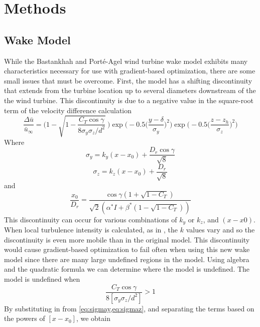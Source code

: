 \documentclass[conf]{new-aiaa}
\begin{document}
\section{Methods}

\subsection{Wake Model}

While the Bastankhah and Port\'{e}-Agel wind turbine wake model exhibits many characteristics necessary for use with gradient-based optimization, there are some small issues that must be overcome. First, the model has a shifting discontinuity that extends from the turbine location up to several diameters downstream of the the wind turbine. This discontinuity is due to a negative value in the square-root term of the velocity difference calculation
\begin{equation}
	\frac{\Delta \bar{u}}{\bar{u}_{\infty}} = \Bigg(1-\sqrt{1-\frac{C_T \cos{\gamma}}{8 \sigma_y \sigma_z/d^2}}~\Bigg) \exp{\bigg(-0.5\Big(\frac{y-\delta}{\sigma_y}\Big)^2\bigg)}\exp{\bigg(-0.5\Big(\frac{z-z_h}{\sigma_z}\Big)^2\bigg)}
\end{equation}
%
Where 
%
\begin{equation}\label{eq:sigmay}
	\sigma_y = k_y (x - x_0) + \frac{D_r \cos{\gamma}}{\sqrt{8}}
\end{equation}
%
%
\begin{equation}\label{eq:sigmaz}
	\sigma_z = k_z (x - x_0) + \frac{D_r}{\sqrt{8}}
\end{equation}
%
and
%
\begin{equation}
	\frac{x_0}{D_r} = \frac{\cos{\gamma }(1+\sqrt{1-C_T})}{\sqrt{2} (\alpha ^* I + \beta ^* (1- \sqrt{1-C_T}))}
\end{equation}
This discontinuity can occur for various combinations of $k_y$ or $k_z$, and $(x-x0)$. When local turbulence intensity is calculated, as in \cite{niayifar2015,niayifar2016}, the $k$ values vary and so the discontinuity is even more mobile than in the original model. This discontinuity would cause gradient-based optimization to fail often when using this new wake model since there are many large undefined regions in the model. Using algebra and the quadratic formula we can determine where the model is undefined. The model is undefined when
%
\begin{equation}
	\frac{C_T \cos{\gamma}}{8[\sigma_y \sigma_z/d^2]} > 1
\end{equation}
%
By substituting in from \cref{eq:sigmay,eq:sigmaz}, and separating the terms based on the powers of $[x-x_0]$, we obtain
\end{document}
